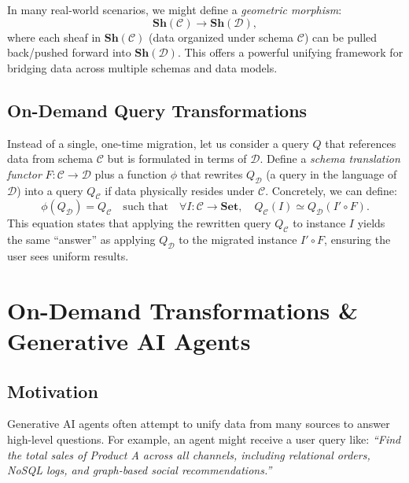 \documentclass[11pt]{article}
\begin{document}
In many real-world scenarios, we might define a \emph{geometric morphism}:
\[
\mathbf{Sh}(\mathcal{C}) \longrightarrow \mathbf{Sh}(\mathcal{D}),
\]
where each sheaf in $\mathbf{Sh}(\mathcal{C})$ (data organized under schema $\mathcal{C}$) can be pulled back/pushed forward into $\mathbf{Sh}(\mathcal{D})$. This offers a powerful unifying framework for bridging data across multiple schemas and data models.

\subsection{On-Demand Query Transformations}
Instead of a single, one-time migration, let us consider a query $Q$ that references data from schema $\mathcal{C}$ but is formulated in terms of $\mathcal{D}$. Define a \emph{schema translation functor} $F: \mathcal{C} \to \mathcal{D}$ plus a function $\phi$ that rewrites $Q_{\mathcal{D}}$ (a query in the language of $\mathcal{D}$) into a query $Q_{\mathcal{C}}$ if data physically resides under $\mathcal{C}$. Concretely, we can define:
\begin{equation}
\phi(Q_{\mathcal{D}}) = Q_{\mathcal{C}} \quad \text{such that} \quad \forall I : \mathcal{C} \to \mathbf{Set}, \quad Q_{\mathcal{C}}(I) \simeq Q_{\mathcal{D}}(I' \circ F).
\end{equation}
This equation states that applying the rewritten query $Q_{\mathcal{C}}$ to instance $I$ yields the same “answer” as applying $Q_{\mathcal{D}}$ to the migrated instance $I' \circ F$, ensuring the user sees uniform results.

\section{On-Demand Transformations \& Generative AI Agents}
\subsection{Motivation}
Generative AI agents often attempt to unify data from many sources to answer high-level questions. For example, an agent might receive a user query like: \emph{“Find the total sales of Product A across all channels, including relational orders, NoSQL logs, and graph-based social recommendations.”}
\end{document}
